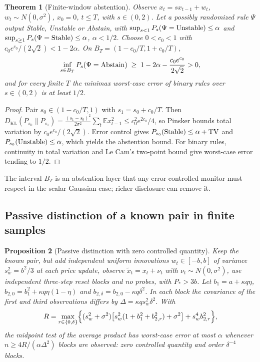 \documentclass[12pt]{article}
\newtheorem{theorem}{Theorem}[section]
\newtheorem{proposition}[theorem]{Proposition}
\theoremstyle{definition}
\theoremstyle{remark}
\newcommand{\E}{\mathbb{E}}
\newcommand{\KL}{D_{\mathrm{KL}}}
\begin{document}
\begin{theorem}[Finite-window abstention]\label{thm:abstain}
Observe $x_t=sx_{t-1}+w_t$, $w_t\sim N(0,\sigma^2)$, $x_0=0$, $t\le T$, with $s\in(0,2)$. Let a possibly randomized rule $\Psi$ output Stable, Unstable or Abstain, with $\sup_{s<1}P_s(\Psi={\rm Unstable})\le\alpha$ and $\sup_{s\ge1}P_s(\Psi={\rm Stable})\le\alpha$, $\alpha<1/2$. Choose $0<c_0<1$ with $c_0e^{c_0}/(2\sqrt2)<1-2\alpha$. On $B_T=(1-c_0/T,1+c_0/T)$,
\[
\inf_{s\in B_T}P_s(\Psi={\rm Abstain})\;\ge\;1-2\alpha-\frac{c_0e^{c_0}}{2\sqrt2}>0 ,
\]
and for every finite $T$ the minimax worst-case error of binary rules over $s\in(0,2)$ is at least $1/2$.
\end{theorem}

\begin{proof}
Pair $s_0\in(1-c_0/T,1)$ with $s_1=s_0+c_0/T$. Then $\KL(P_{s_0}\|P_{s_1})=\frac{(s_1-s_0)^2}{2\sigma^2}\sum_t\E x_{t-1}^2\le c_0^2e^{2c_0}/4$, so Pinsker bounds total variation by $c_0e^{c_0}/(2\sqrt2)$. Error control gives $P_{s_0}({\rm Stable})\le\alpha+{\rm TV}$ and $P_{s_0}({\rm Unstable})\le\alpha$, which yields the abstention bound. For binary rules, continuity in total variation and Le Cam's two-point bound give worst-case error tending to $1/2$.
\end{proof}

The interval $B_T$ is an abstention layer that any error-controlled monitor must respect in the scalar Gaussian case; richer disclosure can remove it.

\subsection{Passive distinction of a known pair in finite samples}

\begin{proposition}[Passive distinction with zero controlled quantity]\label{prop:passive0}
Keep the known pair, but add independent uniform innovations $w_t\in[-b,b]$ of variance $s_w^2=b^2/3$ at each price update, observe $\tilde x_t=x_t+\nu_t$ with $\nu_t\sim N(0,\sigma^2)$, use independent three-step reset blocks and no probes, with $P_*>3b$. Let $b_1=a+\kappa q\eta$, $b_{2,0}=b_1^2+\kappa q\eta(1-\eta)$ and $b_{2,\delta}=b_{2,0}-\kappa q\delta^2$. In each block the covariance of the first and third observations differs by $\Delta=\kappa qs_w^2\delta^2$. With
\[
R=\max_{r\in\{0,\delta\}}\Bigl\{(s_w^2+\sigma^2)\bigl[s_w^2(1+b_1^2+b_{2,r}^2)+\sigma^2\bigr]+s_w^4b_{2,r}^2\Bigr\},
\]
the midpoint test of the average product has worst-case error at most $\alpha$ whenever $n\ge4R/(\alpha\Delta^2)$ blocks are observed: zero controlled quantity and order $\delta^{-4}$ blocks.
\end{proposition}
\end{document}
